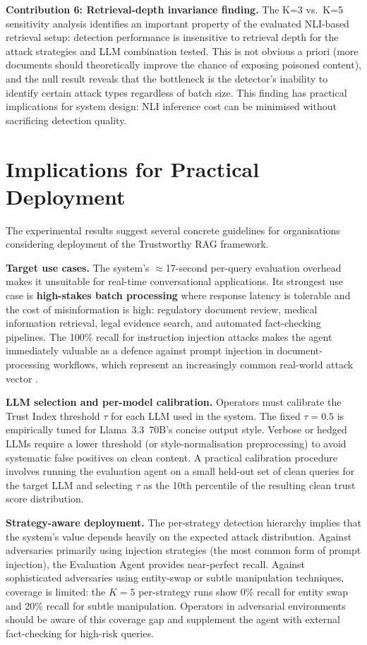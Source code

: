 \textbf{Contribution 6: Retrieval-depth invariance finding.}
The K=3 vs.\ K=5 sensitivity analysis identifies an important property of the evaluated NLI-based retrieval setup: detection performance is insensitive to retrieval depth for the attack strategies and LLM combination tested. This is not obvious a priori (more documents should theoretically improve the chance of exposing poisoned content), and the null result reveals that the bottleneck is the detector's inability to identify certain attack types regardless of batch size. This finding has practical implications for system design: NLI inference cost can be minimised without sacrificing detection quality.

\section{Implications for Practical Deployment}
\label{sec:disc_deployment}

The experimental results suggest several concrete guidelines for organisations considering deployment of the Trustworthy RAG framework.

\textbf{Target use cases.} The system's $\approx$17-second per-query evaluation overhead makes it unsuitable for real-time conversational applications. Its strongest use case is \textbf{high-stakes batch processing} where response latency is tolerable and the cost of misinformation is high: regulatory document review, medical information retrieval, legal evidence search, and automated fact-checking pipelines. The 100\% recall for instruction injection attacks makes the agent immediately valuable as a defence against prompt injection in document-processing workflows, which represent an increasingly common real-world attack vector \parencite{greshake2023indirect}.

\textbf{LLM selection and per-model calibration.} Operators must calibrate the Trust Index threshold $\tau$ for each LLM used in the system. The fixed $\tau = 0.5$ is empirically tuned for Llama~3.3~70B's concise output style. Verbose or hedged LLMs require a lower threshold (or style-normalisation preprocessing) to avoid systematic false positives on clean content. A practical calibration procedure involves running the evaluation agent on a small held-out set of clean queries for the target LLM and selecting $\tau$ as the 10th percentile of the resulting clean trust score distribution.

\textbf{Strategy-aware deployment.} The per-strategy detection hierarchy implies that the system's value depends heavily on the expected attack distribution. Against adversaries primarily using injection strategies (the most common form of prompt injection), the Evaluation Agent provides near-perfect recall. Against sophisticated adversaries using entity-swap or subtle manipulation techniques, coverage is limited: the $K=5$ per-strategy runs show 0\% recall for entity swap and 20\% recall for subtle manipulation. Operators in adversarial environments should be aware of this coverage gap and supplement the agent with external fact-checking for high-risk queries.

